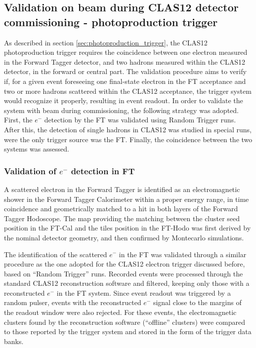 \subsection{Validation on beam during CLAS12 detector commissioning -  photoproduction trigger}

As described in section \ref{sec:photoproduction_trigger}, the CLAS12 photoproduction trigger requires the coincidence between one electron measured in the Forward Tagger detector, and two hadrons measured within the CLAS12 detector, in the forward or central part. The validation procedure aims to verify if, for a given event foreseeing one final-state electron in the FT acceptance and two or more hadrons scattered within the CLAS12 acceptance, the trigger system would recognize it properly, resulting in event readout. In order to validate the system with beam during commissioning, the following strategy was adopted. First, the $e^-$ detection by the FT was validated using Random Trigger runs. After this, the detection of single hadrons in CLAS12 was studied in special runs, were the only trigger source was the FT. Finally, the coincidence between the two systems was assessed.

\subsubsection{Validation of $e^-$ detection in FT}

A scattered electron in the Forward Tagger is identified as an electromagnetic shower in the Forward Tagger Calorimeter within a proper energy range, in time coincidence and geometrically matched to a hit in both layers of the Forward Tagger Hodoscope. The map providing the matching between the cluster seed position in the FT-Cal and the tiles position in the FT-Hodo was first derived by the nominal detector geometry, and then confirmed by Montecarlo simulations.

The identification of the scattered $e^-$ in the FT was validated through a similar procedure as the one adopted for the CLAS12 electron trigger discussed before, based on ``Random Trigger'' runs. Recorded events were processed through the standard CLAS12 reconstruction software and filtered, keeping only those with a reconstructed $e^-$ in the FT system. Since event readout was triggered by a random pulser, events with the reconstructed $e^-$ signal close to the margins of the readout window were also rejected.
For these events, the electromagnetic clusters found by the reconstruction software (``offline'' clusters) were compared to those reported by the trigger system and stored in the form of the trigger data banks.

